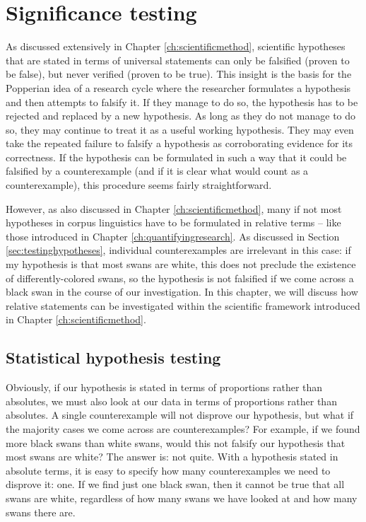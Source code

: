 \chapter{Significance testing}
\label{ch:significancetesting}

As discussed extensively in Chapter \ref{ch:scientificmethod}, scientific hypotheses that are stated in terms of universal statements can only be falsified (proven to be false), but never verified (proven to be true). This insight is the basis for the Popperian idea of a research cycle where the researcher formulates a hypothesis and then attempts to falsify it. If they manage to do so, the hypothesis has to be rejected and replaced by a new hypothesis. As long as they do not manage to do so, they may continue to treat it as a useful working hypothesis. They may even take the repeated failure to falsify a hypothesis as corroborating evidence for its correctness. If the hypothesis can be formulated in such a way that it could be falsified by a counterexample (and if it is clear what would count as a counterexample), this procedure seems fairly straightforward.

However, as also discussed in Chapter \ref{ch:scientificmethod}, many if not most hypotheses in corpus linguistics have to be formulated in relative terms -- like those introduced in Chapter \ref{ch:quantifyingresearch}. As discussed in Section \ref{sec:testinghypotheses}, individual counterexamples are irrelevant in this case: if my hypothesis is that most swans are white, this does not preclude the existence of differently-colored swans, so the hypothesis is not falsified if we come across a black swan in the course of our investigation. In this chapter, we will discuss how relative statements can be investigated within the scientific framework introduced in Chapter \ref{ch:scientificmethod}.

\section{Statistical hypothesis testing}
\label{sec:statisticalhypothesistesting}

Obviously, if our hypothesis is stated in terms of proportions rather than absolutes, we must also look at our data in terms of proportions rather than absolutes. A single counterexample will not disprove our hypothesis, but what if the majority cases we come across are counterexamples? For example, if we found more black swans than white swans, would this not falsify our hypothesis that most swans are white? The answer is: not quite. With a hypothesis stated in absolute terms, it is easy to specify how many counterexamples we need to disprove it: one. If we find just one black swan, then it cannot be true that all swans are white, regardless of how many swans we have looked at and how many swans there are.

